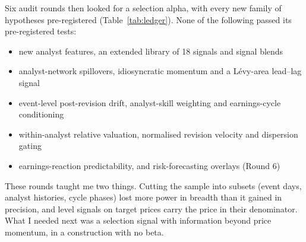  Six audit rounds then looked for a selection alpha, with every new family of hypotheses pre-registered (Table~\ref{tab:ledger}). None of the following passed its pre-registered tests:
\begin{itemize}
  \item new analyst features, an extended library of 18 signals and signal blends
  \item analyst-network spillovers, idiosyncratic momentum and a L\'evy-area lead--lag signal
  \item event-level post-revision drift, analyst-skill weighting and earnings-cycle conditioning
  \item within-analyst relative valuation, normalised revision velocity and dispersion gating
  \item earnings-reaction predictability, and risk-forecasting overlays (Round 6)
\end{itemize}
These rounds taught me two things. Cutting the sample into subsets (event days, analyst histories, cycle phases) lost more power in breadth than it gained in precision, and level signals on target prices carry the price in their denominator. What I needed next was a selection signal with information beyond price momentum, in a construction with no beta.

